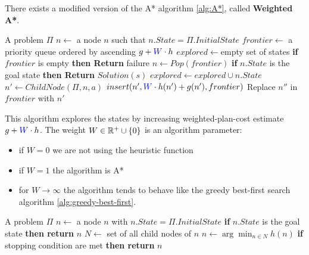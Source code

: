 \documentclass[10pt, letterpaper]{report}
\begin{document}
 There exists a modified version of the A* algorithm \ref{alg:A*}, called \textbf{Weighted A*}.

 \begin{algorithm}
    \caption{Weighted-A*}\label{alg:WA*}
    \begin{algorithmic}
    \Require A problem $\Pi$
    \State $n\leftarrow$ a node $n$ such that $n.State=\Pi.InitialState$
    \State $frontier\leftarrow$ a priority queue ordered by ascending $g+\color{blue}W\color{black}\cdot h$
    \State $explored\leftarrow $empty set of states
    \State \textbf{if} $frontier$ is empty \textbf{then Return} failure 
    \State $n\leftarrow Pop(frontier)$
    \State \textbf{if} $n.State$ is the goal state \textbf{then Return} $Solution(s)$
    \State $explored\leftarrow explored \cup n.State$
    \State $n'\leftarrow ChildNode(\Pi,n,a)$
    \State $insert(n',\color{blue}W\color{black}\cdot h(n')+g(n'),frontier)$ 
    \State Replace $n''$ in $frontier$ with $n'$
    \EndIf
    \EndFor
    \EndWhile
    \end{algorithmic}
\end{algorithm}
This algorithm explores the states by increasing weighted-plan-cost
 estimate $g+\color{blue}W\color{black}\cdot h$. The weight $W\in {\mathbb R}^+\cup\{0\}$ is an algorithm parameter:\begin{itemize}
    \item if $W=0$ we are not using the heuristic function 
    \item if $W=1$ the algorithm is A* 
    \item for $W\rightarrow \infty$ the algorithm tends to behave like the greedy best-first search algorithm \ref{alg:greedy-best-first}.
 \end{itemize} 

\begin{algorithm}
    \caption{Hill-Climbing}\label{alg:HC}
    \begin{algorithmic}
    \Require A problem $\Pi$
    \State $n\leftarrow$ a node $n$ with $n.State=\Pi.InitialState$
    \State\textbf{if} $n.State$ is the goal state \textbf{then return} $n$ 
    \State $N\leftarrow$ set of all child nodes of $n$
    \State $n\leftarrow \arg\min_{n\in N} h(n)$
    \State\textbf{if} stopping condition are met \textbf{then return} $n$ 
    \EndWhile
    \end{algorithmic}
\end{algorithm}\bigskip
\end{document}
